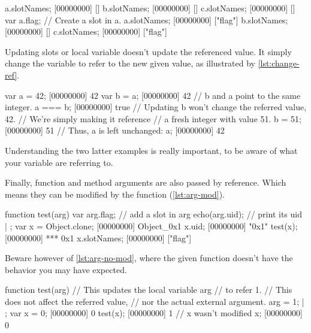 \documentclass[openright,twoside,12pt]{report}
\begin{document}
\begin{urbiscript}[caption=Shared modification,
  label=lst:same-ref-mod, name=same]
a.slotNames;
[00000000] []
b.slotNames;
[00000000] []
c.slotNames;
[00000000] []
var a.flag; // Create a slot in a.
a.slotNames;
[00000000] ["flag"]
b.slotNames;
[00000000] []
c.slotNames;
[00000000] ["flag"]
\end{urbiscript}

Updating slots or local variable doesn't update the referenced
value. It simply change the variable to refer to the new given value,
as illustrated by \autoref{lst:change-ref}.

\begin{urbiscript}[caption=Updates just change the referee,
  label=lst:change-ref]
var a = 42;
[00000000] 42
var b = a;
[00000000] 42
// b and a point to the same integer.
a === b;
[00000000] true
// Updating b won't change the referred value, 42.
// We're simply making it reference
// a fresh integer with value 51.
b = 51;
[00000000] 51
// Thus, a is left unchanged:
a;
[00000000] 42
\end{urbiscript}

Understanding the two latter examples is really important, to be aware
of what your variable are referring to.

Finally, function and method arguments are also passed by
reference. Which means they can be modified by the function
(\autoref{lst:arg-mod}).

\begin{urbiscript}[caption=Function modifying its argument,
label=lst:arg-mod]
function test(arg)
{
  var arg.flag;  // add a slot in arg
  echo(arg.uid); // print its uid
} | {};
var x = Object.clone;
[00000000] Object_0x1
x.uid;
[00000000] "0x1"
test(x);
[00000000] *** 0x1
x.slotNames;
[00000000] ["flag"]
\end{urbiscript}

Beware however of \autoref{lst:arg-no-mod}, where the given function doesn't
have the behavior you may have expected.

\begin{urbiscript}[caption=Function failing to modify its argument,
label=lst:arg-no-mod]
function test(arg)
{
  // This updates the local variable arg
  // to refer 1.
  // This does not affect the referred value,
  // nor the actual external argument.
  arg = 1;
} | {};
var x = 0;
[00000000] 0
test(x);
[00000000] 1
// x wasn't modified
x;
[00000000] 0
\end{urbiscript}
\end{document}
